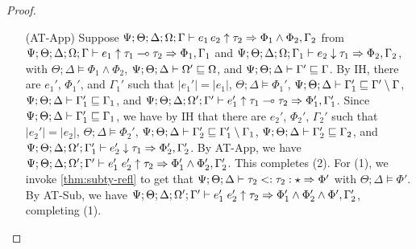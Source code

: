 \begin{proof}
\begin{itemize}
  \item[(AT-App)] Suppose $\Psi ; \Theta ; \Delta ; \Omega ; \Gamma\vdash e_1 \, e_2 \uparrow  \tau_2 \Rightarrow \Phi_1 \wedge \Phi_2, \Gamma_2$ from
  $\Psi ; \Theta ; \Delta ; \Omega ; \Gamma\vdash e_1 \uparrow \tau_1 \multimap \tau_2 \Rightarrow \Phi_1, \Gamma_1$ and
  $\Psi ; \Theta ; \Delta ; \Omega ; \Gamma_1\vdash e_2 \downarrow \tau_1 \Rightarrow \Phi_2, \Gamma_2$, with
  $\Theta ; \Delta \vDash \Phi_1 \wedge \Phi_2$,
  $\Psi ; \Theta ; \Delta \vdash \Omega' \sqsubseteq \Omega$, and
  $\Psi ; \Theta ; \Delta \vdash \Gamma' \sqsubseteq \Gamma$.
  By IH, there are $e_1'$, $\Phi_1'$, and $\Gamma_1'$ such that
  $|e_1'| = |e_1|$,
  $\Theta ; \Delta \vDash \Phi_1'$,
  $\Psi ; \Theta ; \Delta \vdash \Gamma_1' \sqsubseteq \Gamma' \setminus \Gamma$,
  $\Psi ; \Theta ; \Delta \vdash \Gamma_1' \sqsubseteq \Gamma_1$, and
  $\Psi ; \Theta ; \Delta ; \Omega' ; \Gamma' \vdash e_1' \uparrow \tau_1 \multimap \tau_2 \Rightarrow \Phi_1',\Gamma_1'$.
  Since $\Psi ; \Theta ; \Delta \vdash \Gamma_1' \sqsubseteq \Gamma_1$,
  we have by IH that there are $e_2'$, $\Phi_2'$, $\Gamma_2'$ such that
  $|e_2'| = |e_2|$,
  $\Theta ; \Delta \vDash \Phi_2'$,
  $\Psi ; \Theta ; \Delta \vdash \Gamma_2' \sqsubseteq \Gamma_1' \setminus \Gamma_1$,
  $\Psi ; \Theta ; \Delta \vdash \Gamma_2' \sqsubseteq \Gamma_2$, and
  $\Psi ; \Theta ; \Delta ; \Omega' ; \Gamma_1' \vdash e_2' \downarrow \tau_1 \Rightarrow \Phi_2',\Gamma_2'$.
  By AT-App, we have
  $\Psi ; \Theta ; \Delta ; \Omega' ; \Gamma' \vdash e_1' \; e_2' \uparrow \tau_2 \Rightarrow \Phi_1' \wedge \Phi_2', \Gamma_2'$.
  This completes (2). For (1), we invoke \autoref{thm:subty-refl} to get that $\Psi ; \Theta ; \Delta \vdash \tau_2 <: \tau_2 : \star \Rightarrow \Phi'$ with
  $\Theta ; \Delta \vDash \Phi'$. By AT-Sub, we have $\Psi ; \Theta ; \Delta ; \Omega' ; \Gamma' \vdash e_1' \; e_2' \uparrow \tau_2 \Rightarrow \Phi_1' \wedge \Phi_2' \wedge \Phi', \Gamma_2'$, completing (1).
  

\end{itemize}
\end{proof}
